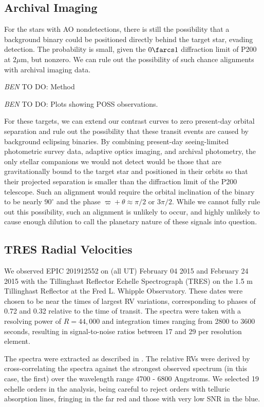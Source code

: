 \documentclass{emulateapj}
\newcommand{\todo}[3]{{\color{#2} \emph{#1} TO DO: #3}}
\newcommand{\btmtodo}[1]{\todo{BEN}{red}{#1}}
\begin{document}
\subsection{Archival Imaging}

For the stars with AO nondetections, there is still the
possibility that a background binary could be positioned
directly behind the target star, evading detection.
The probability is small, given the $0\farcs1$ diffraction limit
of P200 at $2\mu$m, but nonzero.
We can rule out the possibility of such chance alignments with
archival imaging data.

\btmtodo{Method}

\btmtodo{Plots showing POSS observations.}

For these targets, we can extend our contrast curves to zero
present-day orbital separation and rule out the possibility that
these transit events are caused by background eclipsing binaries.
By combining present-day seeing-limited photometric survey data,
adaptive optics imaging, and archival photometry, the only stellar companions
we would not detect would be those that are gravitationally bound to the target
star and positioned in their orbits so that their projected separation is
smaller than the diffraction limit of the P200 telescope.
Such an alignment would require the orbital inclination of the binary to be
nearly $90^\circ$ and the phase $\varpi + \theta \approx \pi/2$ or $3\pi/2$.
While we cannot fully rule out this possibility, such an alignment is unlikely
to occur, and highly unlikely to cause enough dilution to call the planetary
nature of these signals into question.




\subsection{TRES Radial Velocities}

We observed EPIC 201912552 on (all UT) February 04 2015 and February 24 2015
with the Tillinghast Reflector Echelle
Spectrograph (TRES) on the 1.5 m Tillinghast Reflector at the Fred L.
Whipple Observatory.
These dates were chosen to be near the times of largest RV variations,
corresponding to phases of 0.72 and 0.32 relative to the time
of transit.
The spectra were taken with a resolving power of $R=44,000$ and
integration times ranging from 2800 to 3600 seconds, resulting in
signal-to-noise ratios between 17 and 29 per resolution element.

The spectra were extracted as described in \citet{Buchhave10}.
The relative RVs were derived by cross-correlating the spectra against the
strongest observed spectrum (in this case, the first) over the wavelength
range 4700 - 6800 Angstroms.
We selected 19 echelle orders in the analysis, being careful to reject
orders with telluric absorption lines, fringing in the far red and those
with very low SNR in the blue.
\end{document}
